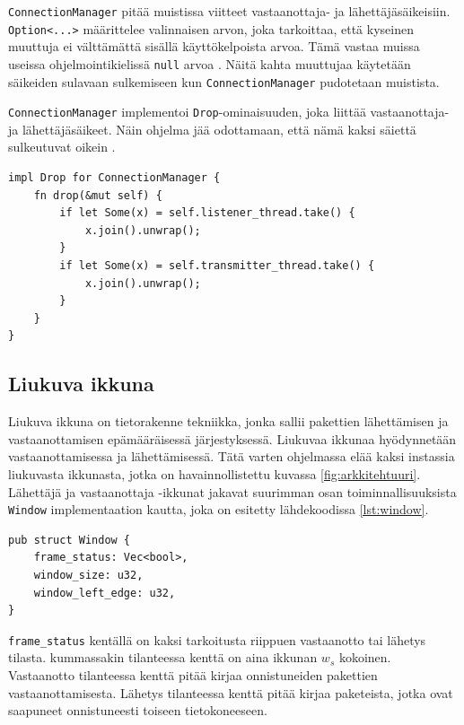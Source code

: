 \documentclass[a4paper,12pt]{article}
\begin{document}
    \lstinline{ConnectionManager} pitää muistissa viitteet vastaanottaja- ja lähettäjäsäikeisiin.
    \lstinline{Option<...>} määrittelee valinnaisen arvon, joka tarkoittaa, että kyseinen muuttuja ei
    välttämättä sisällä käyttökelpoista arvoa. Tämä vastaa muissa useissa ohjelmointikielissä \lstinline{null} arvoa \cite[luku 6.1]{rust-book}. Näitä kahta muuttujaa käytetään säikeiden sulavaan sulkemiseen kun \lstinline{ConnectionManager} pudotetaan muistista.

    \lstinline{ConnectionManager} implementoi \lstinline{Drop}-ominaisuuden, joka liittää vastaanottaja-
    ja lähettäjäsäikeet. Näin ohjelma jää odottamaan, että nämä kaksi säiettä sulkeutuvat oikein \cite{rust_doc_joinhandle}.

    \begin{lstlisting}[caption={Drop-ominaisuuden toteutus ConnectionManager:ille}, label={lst:connectionmanager_drop}]
impl Drop for ConnectionManager {
    fn drop(&mut self) {
        if let Some(x) = self.listener_thread.take() {
            x.join().unwrap();
        }
        if let Some(x) = self.transmitter_thread.take() {
            x.join().unwrap();
        }
    }
}\end{lstlisting}


    \subsection{Liukuva ikkuna}\label{sec:liukuva_ikkuna}
    \slidingWindow
    Liukuva ikkuna on tietorakenne tekniikka, jonka sallii pakettien lähettämisen ja vastaanottamisen epämääräisessä järjestyksessä. 
    Liukuvaa ikkunaa hyödynnetään vastaanottamisessa ja lähettämisessä. Tätä varten ohjelmassa elää kaksi instassia liukuvasta ikkunasta, jotka on havainnollistettu kuvassa \ref{fig:arkkitehtuuri}. Lähettäjä ja vastaanottaja -ikkunat jakavat suurimman osan toiminnallisuuksista \lstinline{Window} implementaation kautta, joka on esitetty lähdekoodissa \ref{lst:window}. 
    
\begin{lstlisting}[caption={Ikkunan rakenne}, label={lst:window}]
pub struct Window {
    frame_status: Vec<bool>,
    window_size: u32,
    window_left_edge: u32,
}\end{lstlisting}

\lstinline{frame_status} kentällä on kaksi tarkoitusta riippuen vastaanotto tai lähetys tilasta. kummassakin tilanteessa kenttä on aina ikkunan $w_s$ kokoinen. Vastaanotto tilanteessa kenttä pitää kirjaa onnistuneiden pakettien vastaanottamisesta. Lähetys tilanteessa kenttä pitää kirjaa paketeista, jotka ovat saapuneet onnistuneesti toiseen tietokoneeseen. \par
\end{document}

